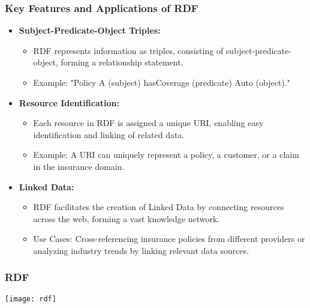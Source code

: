 \begin{frame}[fragile]
\frametitle{Key Features and Applications of RDF}
\begin{itemize}
\item \textbf{Subject-Predicate-Object Triples:}
\begin{itemize}
\item RDF represents information as triples, consisting of subject-predicate-object, forming a relationship statement.
\item Example: "Policy A (subject) hasCoverage (predicate) Auto (object)."
\end{itemize}

\item \textbf{Resource Identification:}
\begin{itemize}
\item Each resource in RDF is assigned a unique URI, enabling easy identification and linking of related data.
\item Example: A URI can uniquely represent a policy, a customer, or a claim in the insurance domain.
\end{itemize}

\item \textbf{Linked Data:}
\begin{itemize}
\item RDF facilitates the creation of Linked Data by connecting resources across the web, forming a vast knowledge network.
\item Use Cases: Cross-referencing insurance policies from different providers or analyzing industry trends by linking relevant data sources.
\end{itemize}
\end{itemize}

\end{frame}

\begin{frame}[fragile]\frametitle{RDF}

\begin{center}
\texttt{[image: rdf]}
\end{center}	  
\end{frame}



